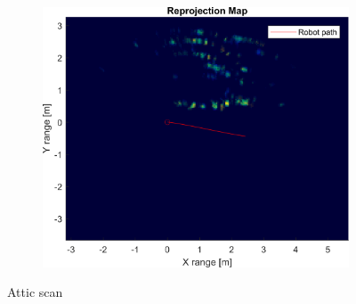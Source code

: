 \begin{figure}[htbp]
\begin{subfigure}[t]{0.5\linewidth}
        \includegraphics[width=\linewidth,max height=.475\textheight]{gfx/results/attic_reprojection.png}
    \end{subfigure}%
    \caption{Attic scan}
\end{figure}

